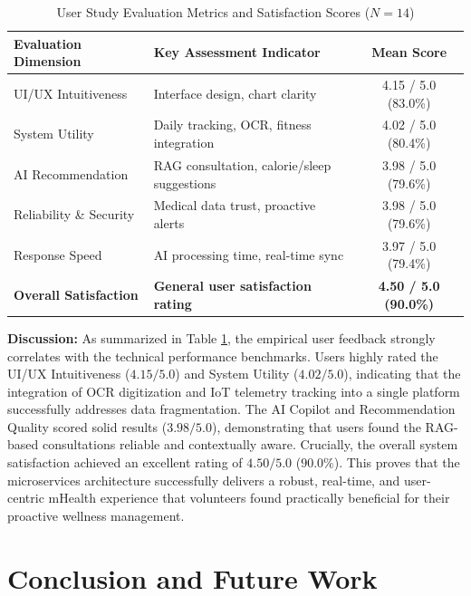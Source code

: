 \documentclass[journal, a4paper]{IEEEtran}
\begin{document}
\begin{table}[htbp]
\caption{User Study Evaluation Metrics and Satisfaction Scores ($N=14$)}
\label{tab:user_study}
\setlength{\tabcolsep}{3pt}
\begin{center}
\begin{tabular}{|p{75pt}|p{100pt}|c|}
\hline
\textbf{Evaluation Dimension} & \textbf{Key Assessment Indicator} & \textbf{Mean Score} \\
\hline
UI/UX Intuitiveness & Interface design, chart clarity & 4.15 / 5.0 (83.0\%) \\
System Utility & Daily tracking, OCR, fitness integration & 4.02 / 5.0 (80.4\%) \\
AI Recommendation & RAG consultation, calorie/sleep suggestions & 3.98 / 5.0 (79.6\%) \\
Reliability \& Security & Medical data trust, proactive alerts & 3.98 / 5.0 (79.6\%) \\
Response Speed & AI processing time, real-time sync & 3.97 / 5.0 (79.4\%) \\
\hline
\textbf{Overall Satisfaction} & \textbf{General user satisfaction rating} & \textbf{4.50 / 5.0 (90.0\%)} \\
\hline
\end{tabular}
\end{center}
\end{table}

\textbf{Discussion:} As summarized in Table \ref{tab:user_study}, the empirical user feedback strongly correlates with the technical performance benchmarks. Users highly rated the UI/UX Intuitiveness ($4.15/5.0$) and System Utility ($4.02/5.0$), indicating that the integration of OCR digitization and IoT telemetry tracking into a single platform successfully addresses data fragmentation. The AI Copilot and Recommendation Quality scored solid results ($3.98/5.0$), demonstrating that users found the RAG-based consultations reliable and contextually aware. Crucially, the overall system satisfaction achieved an excellent rating of $4.50/5.0$ ($90.0\%$). This proves that the microservices architecture successfully delivers a robust, real-time, and user-centric mHealth experience that volunteers found practically beneficial for their proactive wellness management.

\section{Conclusion and Future Work}
\label{sec:conclusion}
\end{document}
